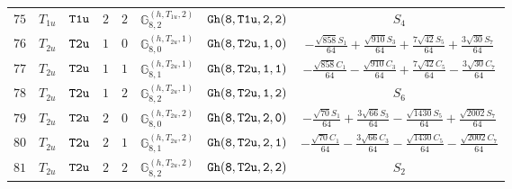 \documentclass[fleqn,8pt]{jsarticle}
\begin{document}
\begin{table}[ht!]
\begin{center}
\begin{tabular}{cccccccc}
$ 75 $ & $ T_{1u} $ & $ {\tt T1u} $ & $ 2 $ & $ 2 $ & $ \mathbb{G}_{8,2}^{(h,T_{1u},2)} $ & $ {\tt Gh(8,T1u,2,2)} $ & $ S_{4} $ \\
$ 76 $ & $ T_{2u} $ & $ {\tt T2u} $ & $ 1 $ & $ 0 $ & $ \mathbb{G}_{8,0}^{(h,T_{2u},1)} $ & $ {\tt Gh(8,T2u,1,0)} $ & $ - \frac{\sqrt{858} S_{1}}{64} + \frac{\sqrt{910} S_{3}}{64} + \frac{7 \sqrt{42} S_{5}}{64} + \frac{3 \sqrt{30} S_{7}}{64} $ \\
$ 77 $ & $ T_{2u} $ & $ {\tt T2u} $ & $ 1 $ & $ 1 $ & $ \mathbb{G}_{8,1}^{(h,T_{2u},1)} $ & $ {\tt Gh(8,T2u,1,1)} $ & $ - \frac{\sqrt{858} C_{1}}{64} - \frac{\sqrt{910} C_{3}}{64} + \frac{7 \sqrt{42} C_{5}}{64} - \frac{3 \sqrt{30} C_{7}}{64} $ \\
$ 78 $ & $ T_{2u} $ & $ {\tt T2u} $ & $ 1 $ & $ 2 $ & $ \mathbb{G}_{8,2}^{(h,T_{2u},1)} $ & $ {\tt Gh(8,T2u,1,2)} $ & $ S_{6} $ \\
$ 79 $ & $ T_{2u} $ & $ {\tt T2u} $ & $ 2 $ & $ 0 $ & $ \mathbb{G}_{8,0}^{(h,T_{2u},2)} $ & $ {\tt Gh(8,T2u,2,0)} $ & $ - \frac{\sqrt{70} S_{1}}{64} + \frac{3 \sqrt{66} S_{3}}{64} - \frac{\sqrt{1430} S_{5}}{64} + \frac{\sqrt{2002} S_{7}}{64} $ \\
$ 80 $ & $ T_{2u} $ & $ {\tt T2u} $ & $ 2 $ & $ 1 $ & $ \mathbb{G}_{8,1}^{(h,T_{2u},2)} $ & $ {\tt Gh(8,T2u,2,1)} $ & $ - \frac{\sqrt{70} C_{1}}{64} - \frac{3 \sqrt{66} C_{3}}{64} - \frac{\sqrt{1430} C_{5}}{64} - \frac{\sqrt{2002} C_{7}}{64} $ \\
$ 81 $ & $ T_{2u} $ & $ {\tt T2u} $ & $ 2 $ & $ 2 $ & $ \mathbb{G}_{8,2}^{(h,T_{2u},2)} $ & $ {\tt Gh(8,T2u,2,2)} $ & $ S_{2} $ \\
 \hline \hline
\end{tabular}
\end{center}
\end{table}
\end{document}
